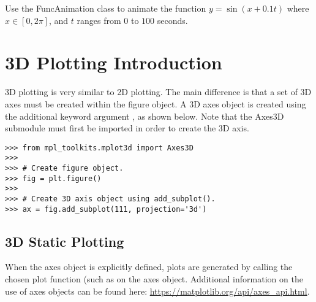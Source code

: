\begin{problem}
Use the FuncAnimation class to animate the function $y=\sin(x+0.1t)$ where $x \in [0,2\pi]$, and $t$ ranges from $0$ to $100$ seconds. 
\end{problem}

\section*{3D Plotting Introduction}
3D plotting is very similar to 2D plotting.
The main difference is that a set of 3D axes must be created within the figure object.
A 3D axes object is created using the additional keyword argument , as shown below. Note that the Axes3D submodule must first be imported in order to create the 3D axis.

\begin{comment}
Like animations, 3D plotting also requires the initialization of a figure object.
After creating a figure object, you can create a 3D axis object by calling \li{gca()} or \li{add_subplot(111)} on the figure object with the keyword argument \li{projection='3d'} as shown below. Both of these functions return a 3D axis object. Note, the 3d projection argument is contained in the Axes3D library. 
\end{comment}

\begin{lstlisting}
>>> from mpl_toolkits.mplot3d import Axes3D
>>>
>>> # Create figure object.
>>> fig = plt.figure()
>>>
>>> # Create 3D axis object using add_subplot().
>>> ax = fig.add_subplot(111, projection='3d')
\end{lstlisting}

\subsection*{3D Static Plotting}
\begin{comment}, as shown below. 

\begin{lstlisting}
>>> x = np.linspace(0,5,10)
>>> y = np.linspace(1,3,10)
>>> z = np.linspace(-1,-1,10)
>>> plt.plot(x, y, z)
>>> plt.show()
\end{lstlisting}
\end{comment}

When the axes object is explicitly defined, plots are generated by calling the chosen plot function (such as  on the axes object.
Additional information on the use of axes objects can be found here: \href{https://matplotlib.org/api/axes\_api.html}{https://matplotlib.org/api/axes\_api.html}.

